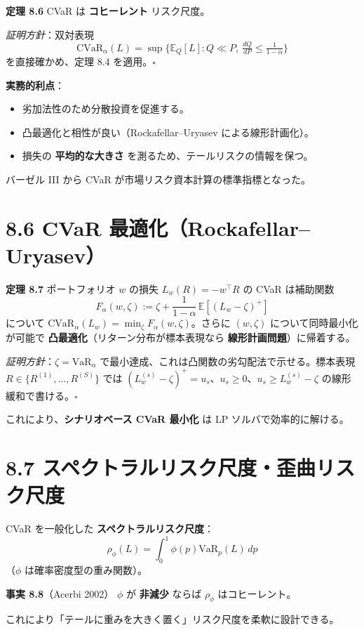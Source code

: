 \documentclass[11pt,a4paper]{report}
\begin{document}
\textbf{定理 8.6} CVaR は \textbf{コヒーレント} リスク尺度。

\emph{証明方針}：双対表現 \[ \mathrm{CVaR}_\alpha(L) = \sup\bigl\{ \mathbb{E}_Q[L] : Q \ll P,\ \tfrac{dQ}{dP} \le \tfrac{1}{1-\alpha}\bigr\} \] を直接確かめ、定理 8.4 を適用。$\square$

\textbf{実務的利点}：
\begin{itemize}
\item 劣加法性のため分散投資を促進する。
\item 凸最適化と相性が良い（Rockafellar–Uryasev による線形計画化）。
\item 損失の \textbf{平均的な大きさ} を測るため、テールリスクの情報を保つ。
\end{itemize}

バーゼル III から CVaR が市場リスク資本計算の標準指標となった。

\section{8.6 CVaR 最適化（Rockafellar–Uryasev）}

\textbf{定理 8.7} ポートフォリオ $w$ の損失 $L_w(R) = -w^\top R$ の CVaR は補助関数 \[ F_\alpha(w, \zeta) := \zeta + \frac{1}{1-\alpha}\, \mathbb{E}[(L_w - \zeta)^+] \] について $\mathrm{CVaR}_\alpha(L_w) = \min_\zeta F_\alpha(w, \zeta)$。さらに $(w, \zeta)$ について同時最小化が可能で \textbf{凸最適化}（リターン分布が標本表現なら \textbf{線形計画問題}）に帰着する。

\emph{証明方針}：$\zeta = \mathrm{VaR}_\alpha$ で最小達成、これは凸関数の劣勾配法で示せる。標本表現 $R \in \{R^{(1)}, \dots, R^{(S)}\}$ では $(L_w^{(s)} - \zeta)^+ = u_s$、$u_s \ge 0$、$u_s \ge L_w^{(s)} - \zeta$ の線形緩和で書ける。$\square$

これにより、\textbf{シナリオベース CVaR 最小化} は LP ソルバで効率的に解ける。

\section{8.7 スペクトラルリスク尺度・歪曲リスク尺度}

CVaR を一般化した \textbf{スペクトラルリスク尺度}： \[ \rho_\phi(L) = \int_0^1 \phi(p) \mathrm{VaR}_p(L) \, dp \] （$\phi$ は確率密度型の重み関数）。

\textbf{事実 8.8}（Acerbi 2002） $\phi$ が \textbf{非減少} ならば $\rho_\phi$ はコヒーレント。

これにより「テールに重みを大きく置く」リスク尺度を柔軟に設計できる。
\end{document}
